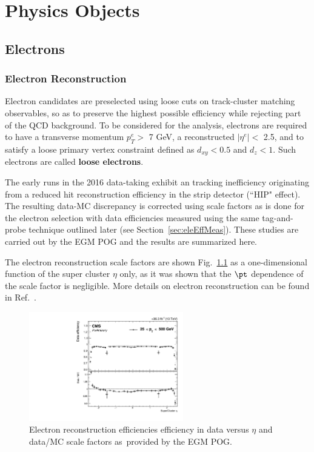 \chapter{Physics Objects}\label{sec:objects}

\section{Electrons}

\subsection{Electron Reconstruction}
\label{sec:eleReco}


Electron candidates are preselected using loose cuts on track-cluster matching observables, so as to preserve the highest possible efficiency while rejecting part of the QCD background. To be considered for the analysis, electrons are required to have a
transverse momentum $p^e_T >$ 7 GeV, a reconstructed $|\eta^e| <$ 2.5, and to satisfy a loose primary vertex 
constraint defined as $d_{xy} < 0.5$ and $d_z < 1$. 
Such electrons are called {\bf loose electrons}.

The early runs in the 2016 data-taking exhibit an tracking inefficiency originating from a reduced hit reconstruction efficiency in the strip detector (``HIP" effect). 
The resulting data-MC discrepancy is corrected using scale factors as is done for the electron selection with data efficiencies measured using the same tag-and-probe technique outlined later (see Section~\ref{sec:eleEffMeas}). 
These studies are carried out by the EGM POG and the results are summarized here.

The electron reconstruction scale factors are shown Fig.~\ref{fig:ele_rec_scale_factors} as a one-dimensional function of the super cluster $\eta$ only, as it was shown that the $\pt$ dependence of the scale factor is negligible. More details on electron reconstruction can be found in Ref.~\cite{ElectronLegacy}. 

\begin{figure}[!htb]
\vspace*{0.3cm}
\begin{center}
\includegraphics[width=0.6\textwidth]{Figures/Electrons/ele_rec_scale_factors.pdf}
\end{center}
\caption{Electron reconstruction efficiencies efficiency in data versus $\eta$ and data/MC scale factors as provided by the EGM POG.}
\label{fig:ele_rec_scale_factors}
\end{figure}

